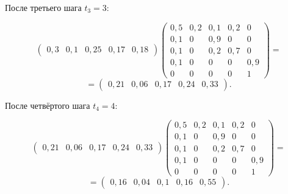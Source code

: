 \documentclass[a4paper, 12pt]{article}
\begin{document}
\begin{enumerate}
{    После третьего шага $t_3=3$:

    $$
    \left (
      \begin{array}{ccccc}
        0,3 & 0,1 & 0,25 & 0,17 & 0,18
      \end{array}
    \right )
    \left (
      \begin{array}{ccccc}
        0,5 & 0,2 & 0,1 & 0,2 & 0 \\
        0,1 & 0 & 0,9 & 0 & 0 \\
        0,1 & 0 & 0,2 & 0,7 & 0 \\
        0,1 & 0 & 0 & 0 & 0,9 \\
        0 & 0 & 0 & 0 & 1
      \end{array}
    \right )=
    $$
    $$
    =
    \left (
      \begin{array}{ccccc}
        0,21 & 0,06 & 0,17 & 0,24 & 0,33
      \end{array}
    \right ).
    $$

    После четвёртого шага $t_4=4$:

    $$
    \left (
      \begin{array}{ccccc}
        0,21 & 0,06 & 0,17 & 0,24 & 0,33
      \end{array}
    \right )
    \left (
      \begin{array}{ccccc}
        0,5 & 0,2 & 0,1 & 0,2 & 0 \\
        0,1 & 0 & 0,9 & 0 & 0 \\
        0,1 & 0 & 0,2 & 0,7 & 0 \\
        0,1 & 0 & 0 & 0 & 0,9 \\
        0 & 0 & 0 & 0 & 1
      \end{array}
    \right )=
    $$
    $$
    =
    \left (
      \begin{array}{ccccc}
        0,16 & 0,04 & 0,1 & 0,16 & 0,55
      \end{array}
    \right ).
    $$
  }
\end{enumerate}
\end{document}
